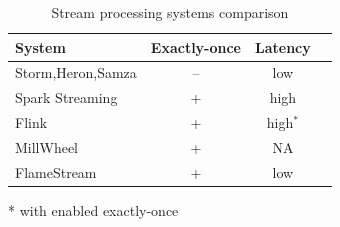 \begin{table}[htbp]
\begin{threeparttable}
\begin{tabular}{lccl}
System             & Exactly-once & Latency    \\
\hline
Storm,Heron,Samza        &    --   &   low            \\
Spark Streaming    &    +    &   high           \\
Flink              &    +     &    high$^*$       \\
MillWheel          &    +    &   NA             \\
FlameStream        &    +    &   low            \\
\end{tabular}
* with enabled exactly-once~\cite{we2018beyondmr}
\end{threeparttable}
\caption{Stream processing systems comparison}
\label{comparison}
\end{table}